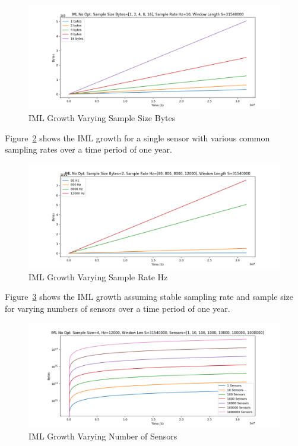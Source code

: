 \begin{figure}[H]
	\centering
	\includegraphics[width=\linewidth]{figures/plot_iml_level_no_opt_var_sample_size.png}
	\caption{IML Growth Varying Sample Size Bytes}
	\label{fig:iml_growth_vary_sample_size}
\end{figure}

Figure~\ref{fig:iml_growth_vary_sample_rate} shows the IML growth for a single sensor with various common sampling rates over a time period of one year.

\begin{figure}[H]
	\centering
	\includegraphics[width=\linewidth]{figures/plot_iml_level_no_opt_var_sample_rate.png}
	\caption{IML Growth Varying Sample Rate Hz}
	\label{fig:iml_growth_vary_sample_rate}
\end{figure}

Figure~\ref{fig:iml_growth_vary_num_sensors} shows the IML growth assuming stable sampling rate and sample size for varying numbers of sensors over a time period of one year.

\begin{figure}[H]
	\centering
	\includegraphics[width=\linewidth]{figures/plot_iml_level_no_opt_var_num_sensors.png}
	\caption{IML Growth Varying Number of Sensors}
	\label{fig:iml_growth_vary_num_sensors}
\end{figure}

